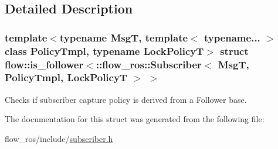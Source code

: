 \subsection{Detailed Description}
\subsubsection*{template$<$typename MsgT, template$<$ typename... $>$ class Policy\+Tmpl, typename Lock\+PolicyT$>$\newline
struct flow\+::is\+\_\+follower$<$\+::flow\+\_\+ros\+::\+Subscriber$<$ Msg\+T, Policy\+Tmpl, Lock\+Policy\+T $>$ $>$}

Checks if subscriber capture policy is derived from a Follower base. 

The documentation for this struct was generated from the following file\+:\begin{DoxyCompactItemize}
\item 
flow\+\_\+ros/include/\hyperlink{subscriber_8h}{subscriber.\+h}\end{DoxyCompactItemize}
